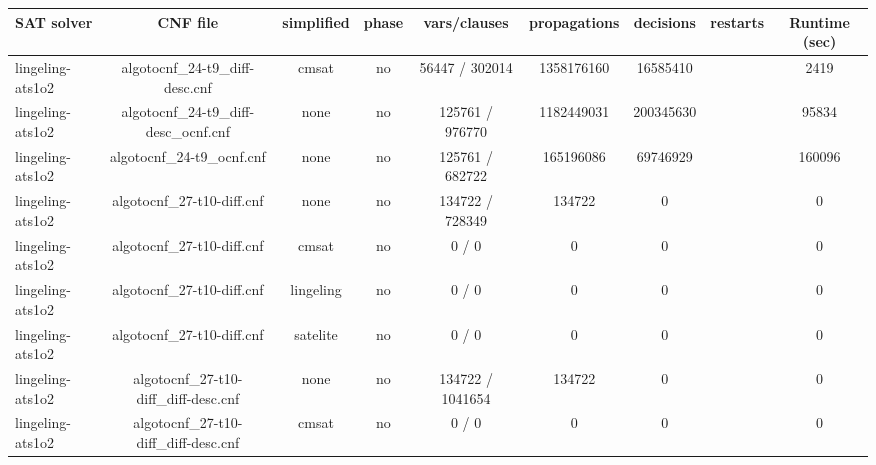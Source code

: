 \begin{appendices}
\begin{table}[p]
  \begin{center}
    \begin{tabular}{l|cccccccc}
        \textbf{SAT solver} & \textbf{CNF file} & \textbf{simplified} & \textbf{phase} & \textbf{vars/clauses} & \textbf{propagations} & \textbf{decisions} & \textbf{restarts} & \textbf{Runtime (sec)} \\
      \hline
  lingeling-ats1o2               & algotocnf\_24-t9\_diff-desc.cnf & cmsat      & no    & 56447 / 302014 & 1358176160 & 16585410  &            & 2419 \\ %
  lingeling-ats1o2               & algotocnf\_24-t9\_diff-desc\_ocnf.cnf & none       & no    & 125761 / 976770 & 1182449031 & 200345630 &            & 95834 \\ %
  lingeling-ats1o2               & algotocnf\_24-t9\_ocnf.cnf     & none       & no    & 125761 / 682722 & 165196086 & 69746929  &            & 160096 \\ %
  lingeling-ats1o2               & algotocnf\_27-t10-diff.cnf     & none       & no    & 134722 / 728349 & 134722    & 0         &            & 0 \\ %
  lingeling-ats1o2               & algotocnf\_27-t10-diff.cnf     & cmsat      & no    & 0 / 0      & 0         & 0         &            & 0 \\ %
  lingeling-ats1o2               & algotocnf\_27-t10-diff.cnf     & lingeling  & no    & 0 / 0      & 0         & 0         &            & 0 \\ %
  lingeling-ats1o2               & algotocnf\_27-t10-diff.cnf     & satelite   & no    & 0 / 0      & 0         & 0         &            & 0 \\ %
  lingeling-ats1o2               & algotocnf\_27-t10-diff\_diff-desc.cnf & none       & no    & 134722 / 1041654 & 134722    & 0         &            & 0 \\ %
  lingeling-ats1o2               & algotocnf\_27-t10-diff\_diff-desc.cnf & cmsat      & no    & 0 / 0      & 0         & 0         &            & 0 \\ %

\end{tabular}
\end{center}
\end{table}
\end{appendices}
